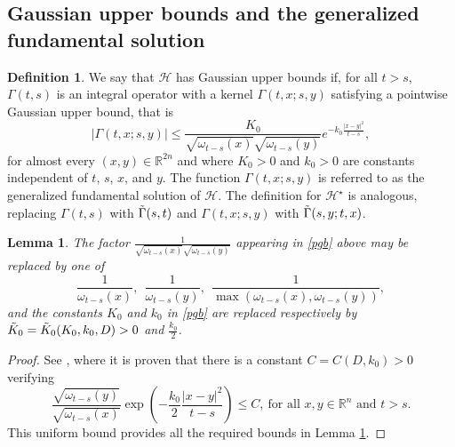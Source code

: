 \documentclass[12pt, letterpaper]{amsart}
\newtheorem{lem}[thm]{Lemma}
\theoremstyle{definition}
\newtheorem{defn}[thm]{Definition}
\theoremstyle{remark}
\numberwithin{equation}{section}
\begin{document}
\subsection{Gaussian upper bounds and the generalized fundamental solution}
\begin{defn} We say that $\mathcal{H}$ has Gaussian upper bounds if, for all $t > s$, $\Gamma(t,s)$ is an integral operator with a kernel $\Gamma(t,x;s,y)$ satisfying a pointwise Gaussian upper bound, that is
\begin{equation}\label{pgb}
    \left | \Gamma(t,x;s,y) \right | \leq \frac{K_0}{\sqrt{\omega_{t-s}(x)}\sqrt{\omega_{t-s}(y)}} e^{-k_0 \frac{|x-y|^2}{t-s}},
\end{equation}
for almost every $(x,y) \in \mathbb{R}^{2n}$ and where $K_0 > 0$ and $k_0 > 0$ are constants independent of $t$, $s$, $x$, and $y$. The function $\Gamma(t,x;s,y)$ is referred to as the generalized fundamental solution of $\mathcal{H}$. The definition for $\mathcal{H}^\star$ is analogous, replacing $\Gamma(t,s)$ with $\Tilde{\Gamma}(s,t)$ and $\Gamma(t,x;s,y)$ with $\Tilde{\Gamma}(s,y;t,x)$.
\end{defn}
\begin{lem}\label{lem:Cruz-Uribe et Rios}
    The factor $\frac{1}{\sqrt{\omega_{t-s}(x)}\sqrt{\omega_{t-s}(y)}}$ appearing in \eqref{pgb} above may be replaced by one of 
    \begin{equation*}
        \frac{1}{\omega_{t-s}(x) }, \ \ \frac{1}{\omega_{t-s}(y) }, \ \ \frac{1}{\max(\omega_{t-s}(x) ,\omega_{t-s}(y))},
    \end{equation*}
    and the constants $K_0$ and $k_0$ in \eqref{pgb} are replaced respectively by $\Tilde{K}_0=\Tilde{K}_0(K_0,k_0,D)>0$ and $\frac{k_0}{2}$.
\end{lem}
\begin{proof}
See \cite[Rem. 3]{cruz2014corrigendum}, where it is proven that there is a constant $C=C(D,k_0)>0$ verifying
\begin{equation*}
    \frac{\sqrt{\omega_{t-s}(y)}}{\sqrt{\omega_{t-s}(x)}} \exp\left( -\frac{k_0}{2} \frac{|x-y|^2}{t-s} \right) \leq C , \ \text{for all $x, y \in \mathbb{R}^n$ and $t > s$.}
\end{equation*}
This uniform bound provides all the required bounds in Lemma \ref{lem:Cruz-Uribe et Rios}.   
\end{proof}
\end{document}
